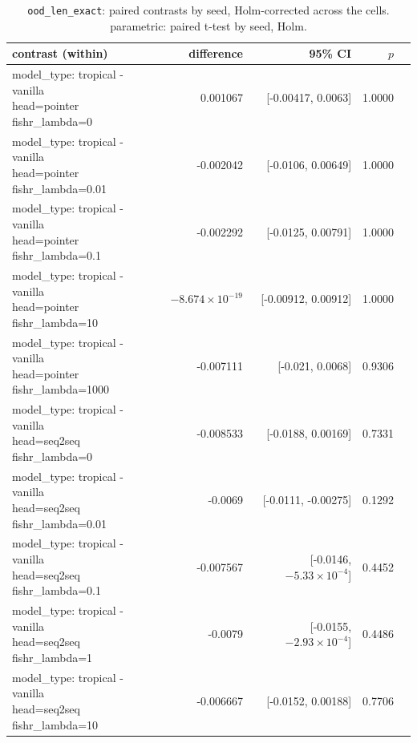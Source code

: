 \documentclass[10pt]{article}
\makeatletter
\newcommand{\stackcell}[1]{\begin{tabular}[t]{@{}l@{}}#1\end{tabular}}
\makeatother
\begin{document}
{\small
\begin{longtable}{lrrrl}
\caption{\texttt{ood\_len\_exact}: paired contrasts by seed, Holm-corrected across the cells. parametric: paired t-test by seed, Holm.}\label{tab:paired-ood_len_exact}\\
\toprule
contrast (within) & difference & 95\% CI & $p$ & \\
\midrule
\endhead
\stackcell{model\_type: tropical - vanilla\\\footnotesize head=pointer fishr\_lambda=0 } & 0.001067 & [-0.00417, 0.0063] & 1.0000 & \\
\stackcell{model\_type: tropical - vanilla\\\footnotesize head=pointer fishr\_lambda=0.01 } & -0.002042 & [-0.0106, 0.00649] & 1.0000 & \\
\stackcell{model\_type: tropical - vanilla\\\footnotesize head=pointer fishr\_lambda=0.1 } & -0.002292 & [-0.0125, 0.00791] & 1.0000 & \\
\stackcell{model\_type: tropical - vanilla\\\footnotesize head=pointer fishr\_lambda=10 } & $-8.674\times10^{-19}$ & [-0.00912, 0.00912] & 1.0000 & \\
\stackcell{model\_type: tropical - vanilla\\\footnotesize head=pointer fishr\_lambda=1000 } & -0.007111 & [-0.021, 0.0068] & 0.9306 & \\
\stackcell{model\_type: tropical - vanilla\\\footnotesize head=seq2seq fishr\_lambda=0 } & -0.008533 & [-0.0188, 0.00169] & 0.7331 & \\
\stackcell{model\_type: tropical - vanilla\\\footnotesize head=seq2seq fishr\_lambda=0.01 } & -0.0069 & [-0.0111, -0.00275] & 0.1292 & \\
\stackcell{model\_type: tropical - vanilla\\\footnotesize head=seq2seq fishr\_lambda=0.1 } & -0.007567 & [-0.0146, $-5.33\times10^{-4}$] & 0.4452 & \\
\stackcell{model\_type: tropical - vanilla\\\footnotesize head=seq2seq fishr\_lambda=1 } & -0.0079 & [-0.0155, $-2.93\times10^{-4}$] & 0.4486 & \\
\stackcell{model\_type: tropical - vanilla\\\footnotesize head=seq2seq fishr\_lambda=10 } & -0.006667 & [-0.0152, 0.00188] & 0.7706 & \\

\end{longtable}}
\end{document}
